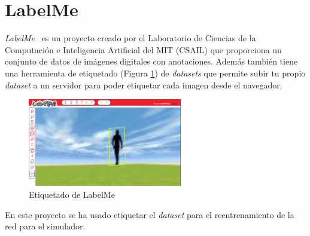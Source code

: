 \section{LabelMe}
\textit{LabelMe}~\cite{labelme} es un proyecto creado por el Laboratorio de Ciencias de la Computación e Inteligencia Artificial del MIT (CSAIL) que proporciona un conjunto de datos de imágenes digitales con anotaciones. Además también tiene una herramienta de etiquetado (Figura \ref{fig:labelme}) de \textit{datasets} que permite subir tu propio \textit{dataset} a un servidor para poder etiquetar cada imagen desde el navegador.
\begin{figure}[H]
  \begin{center}
    \includegraphics[width=0.6\textwidth]{figures/herramientas/labelme.png}
		\caption{Etiquetado de LabelMe}
		\label{fig:labelme}
		\end{center}
\end{figure}

En este proyecto se ha usado etiquetar el \textit{dataset} para el reentrenamiento de la red para el simulador.
